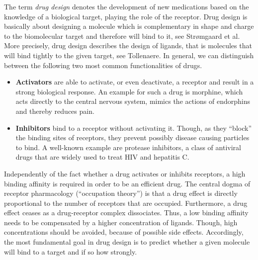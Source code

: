 The term \textit{drug design} denotes the development of new medications based on the knowledge of a biological target, playing the role of the receptor.
Drug design is basically about designing a molecule which is
complementary in shape and charge to the biomolecular target and therefore will bind to it, see Str{\o}mgaard et al\cite{stromgaard2002}.
More precisely, drug design describes the design of ligands, that is molecules that will bind tightly to the given target, see Tollenaere\cite{tollenaere1996}.
In general, we can distinguish between the following two most common functionalities of drugs.
\begin{itemize}
\item \textbf{\textsf{Activators}} are able to activate, or even deactivate, a receptor and result in a strong biological response.
An example for such a drug is morphine, which acts directly to the central nervous system, mimics the actions of endorphins and thereby reduces pain.
\item \textbf{\textsf{Inhibitors}} bind to a receptor without activating it. Though, as they ``block'' the binding sites of receptors, they prevent possibly disease causing particles to bind.
A well-known example are protease inhibitors, a class of antiviral drugs that are widely used to treat HIV and hepatitis C.
\end{itemize}

Independently of the fact whether a drug activates or inhibits receptors, a high binding affinity is required in order to be an efficient drug.
The central dogma of receptor pharmacology (``occupation theory'') is that a drug effect is directly proportional to the number of receptors that are occupied. Furthermore, a drug effect ceases as a drug-receptor complex dissociates.
Thus, a low binding affinity needs to be compensated by a higher concentration of ligands.
Though, high concentrations should be avoided, because of possible side effects.
Accordingly, the most fundamental goal in drug design is to predict whether a given molecule will bind to a target and if so how strongly.

